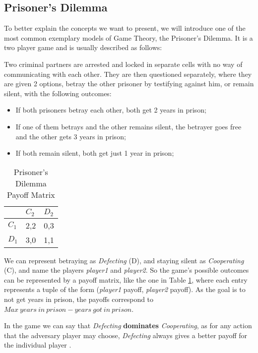 \subsection{Prisoner's Dilemma}
\label{subsec:PrisonersDilemma}
To better explain the concepts we want to present, we will introduce one of the most common exemplary models of Game Theory, the Prisoner's Dilemma. It is a two player game and is usually described as follows:

Two criminal partners are arrested and locked in separate cells with no way of communicating with each other. They are then questioned separately, where they are given 2 options, betray the other prisoner by testifying against him, or remain silent, with the following outcomes:
\begin{itemize}
    \item If both prisoners betray each other, both get 2 years in prison;
    \item If one of them betrays and the other remains silent, the betrayer goes free and the other gets 3 years in prison;
    \item If both remain silent, both get just 1 year in prison;
\end{itemize}

\begin{table}[h]
    \centering
    \normalsize{
        \footnotesize
        \begin{tabular}{l|l|l|}
            \cline{2-3}
            & $C_2$   & $D_2$   \\ \hline
            \multicolumn{1}{|l|}{$C_1$} & 2,2 & 0,3 \\ \hline
            \multicolumn{1}{|l|}{$D_1$} & 3,0 & 1,1 \\ \hline
        \end{tabular}
    }
    \caption{Prisoner's Dilemma Payoff Matrix}
    \label{tbl:PrisonerDilemaPayoffMatrix}
\end{table}	
We can represent betraying as \textit{Defecting} (D), and staying silent as \textit{Cooperating} (C), and name the players \textit{player1} and \textit{player2}. So the game's possible outcomes can be represented by a payoff matrix, like the one in Table \ref{tbl:PrisonerDilemaPayoffMatrix}, where each entry represents a tuple of the form (\textit{player1} payoff, \textit{player2} payoff). As the goal is to not get years in prison, the payoffs correspond to $Max\ years\ in\ prison - years\ got\ in\ prison$.


In the game we can say that \textit{Defecting} \textbf{dominates} \textit{Cooperating}, as for any action that the adversary player may choose, \textit{Defecting} always gives a better payoff for the individual player \cite{Nash1951}.

